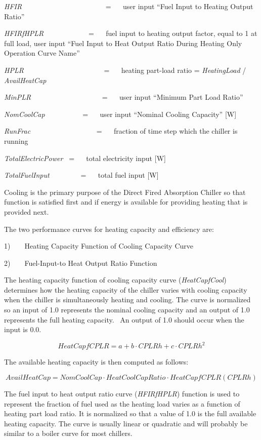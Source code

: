\emph{HFIR}~~~~~~~~~~~~~~~~~~~~~~~ = ~~ user input ``Fuel Input to Heating Output Ratio''

\emph{HFIRfHPLR}~~~~~~~~~~~~ = ~~ fuel input to heating output factor, equal to 1 at full load, user input ``Fuel Input to Heat Output Ratio During Heating Only Operation Curve Name''

\emph{HPLR}~~~~~~~~~~~~~~~~~~~~~~ = ~~ heating part-load ratio = \emph{HeatingLoad} / \emph{AvailHeatCap}

\emph{MinPLR~~~~~~~~~~~~~~~~~~~} = ~~ user input ``Minimum Part Load Ratio''

\emph{NomCoolCap}~~~~~~~~~~ = ~~ user input ``Nominal Cooling Capacity'' {[}W{]}

\emph{RunFrac}~~~~~~~~~~~~~~~~~~ = ~~ fraction of time step which the chiller is running

\emph{TotalElectricPower~} = ~~ total electricity input {[}W{]}

\emph{TotalFuelInput~~~~~~~~} = ~~ total fuel input {[}W{]}

Cooling is the primary purpose of the Direct Fired Absorption Chiller so that function is satisfied first and if energy is available for providing heating that is provided next.

The two performance curves for heating capacity and efficiency are:

1)~~~~Heating Capacity Function of Cooling Capacity Curve

2)~~~~Fuel-Input-to Heat Output Ratio Function

The heating capacity function of cooling capacity curve (\emph{HeatCapfCool}) determines how the heating capacity of the chiller varies with cooling capacity when the chiller is simultaneously heating and cooling. The curve is normalized so an input of 1.0 represents the nominal cooling capacity and an output of 1.0 represents the full heating capacity.~ An output of 1.0 should occur when the input is 0.0.

\begin{equation}
HeatCapfCPLR = a + b \cdot CPLRh + c \cdot CPLR{h^2}
\end{equation}

The available heating capacity is then computed as follows:

\begin{equation}
AvailHeatCap = NomCoolCap \cdot HeatCoolCapRatio \cdot HeatCapfCPLR(CPLRh)
\end{equation}

The fuel input to heat output ratio curve (\emph{HFIRfHPLR}) function is used to represent the fraction of fuel used as the heating load varies as a function of heating part load ratio. It is normalized so that a value of 1.0 is the full available heating capacity. The curve is usually linear or quadratic and will probably be similar to a boiler curve for most chillers.

